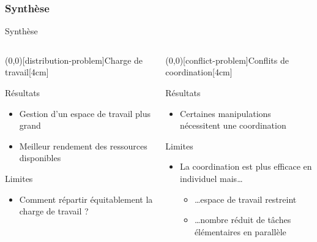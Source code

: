 \documentclass[english,french,dvips,10pt]{mybeamer}
\begin{document}
	\subsubsection{Synthèse}
	\begin{myframe}{Synthèse}
		\begin{columns}[t]
			\begin{column}{0.475\textwidth}
				\centering
				\myunode[90][shadowcolor=mygreen](0,0)[distribution-problem]{Charge de travail}[4cm]
				\begin{myplusblock}{Résultats }
					\begin{itemize}
						\item Gestion d'un espace de travail plus grand
						\item Meilleur rendement des ressources disponibles
					\end{itemize}
				\end{myplusblock}
				\begin{myminusblock}{Limites}
					\begin{itemize}
						\item Comment répartir équitablement la charge de travail ?
					\end{itemize}
				\end{myminusblock}
			\end{column}
			\begin{column}{0.475\textwidth}
				\centering
				\myunode[90][shadowcolor=mygreen](0,0)[conflict-problem]{Conflits de coordination}[4cm]
				\begin{myplusblock}{Résultats }
					\begin{itemize}
						\item Certaines manipulations nécessitent une coordination
					\end{itemize}
				\end{myplusblock}
				\begin{myminusblock}{Limites}
					\begin{itemize}
						\item La coordination est plus efficace en individuel mais\dots
							\begin{itemize}
								\item \dots{}espace de travail restreint
								\item \dots{}nombre réduit de tâches élémentaires en parallèle

\end{itemize}
\end{itemize}
\end{myminusblock}
\end{column}
\end{columns}
\end{myframe}
\end{document}
